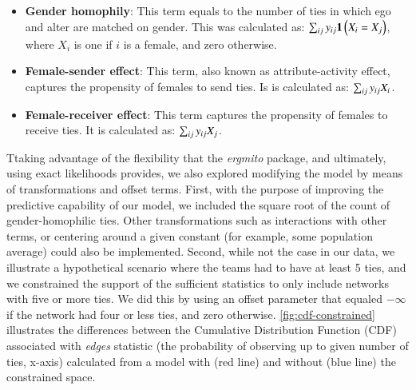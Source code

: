\documentclass[review, nonatbib,doubleblind]{elsarticle/elsarticle}
\begin{document}
\begin{itemize}
    \item \textbf{Gender homophily}: This term equals to the number of ties in which ego and alter are matched on gender. This was calculated as: $\sum_{ij}y_{ij}{\boldsymbol{1}\left( X_{i} = X_{j} \right)}$, where $X_i$ is one if $i$ is a female, and zero otherwise.
    \item \textbf{Female-sender effect}: This term, also known as attribute-activity effect, captures the propensity of females to send ties. Is is calculated as: $\sum_{ij}y_{ij}X_{i}$.
    \item \textbf{Female-receiver effect}: This term captures the propensity of females to receive ties. It is calculated as: $\sum_{ij}y_{ij}X_{j}$.
\end{itemize}
Ttaking advantage of the flexibility that the \textit{ergmito} package, and ultimately, using exact likelihoods provides, we also explored modifying the model by means of transformations and offset terms. First, with the purpose of improving the predictive capability of our model, we included the square root of the count of gender-homophilic ties. Other transformations such as interactions with other terms, or centering around a given constant (for example, some population average) could also be implemented. Second, while not the case in our data, we illustrate a hypothetical scenario where the teams had to have at least 5 ties, and we constrained the support of the sufficient statistics to only include networks with five or more ties. We did this by using an offset parameter that equaled $-\infty$ if the network had four or less ties, and zero otherwise. \autoref{fig:cdf-constrained} illustrates the differences between the Cumulative Distribution Function (CDF) associated with \textit{edges} statistic (the probability of observing up to given number of ties, x-axis) calculated from a model with (red line) and without (blue line) the constrained space.
\end{document}
